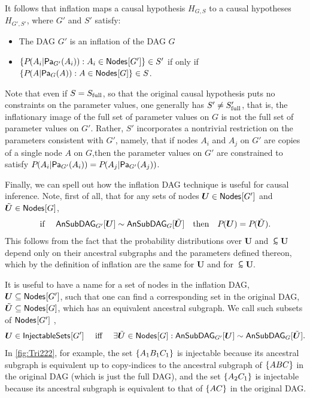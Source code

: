 It follows that inflation maps a causal hypothesis $H_{G,S}$ 
to a causal hypotheses $H_{G',S'}$,
 where $G'$ and $S'$ satisfy:
\begin{itemize}
\item The DAG $G'$ is an inflation of the DAG $G$ 
\item $\{ \pdf{A_i| \Pa[G']{A_i}} : A_i \in \SmallNamedFunction{Nodes}{G'}\} \in S'$ if only if  $\{ \pdf{A| \Pa[G]{A}} : A \in \SmallNamedFunction{Nodes}{G}\} \in S$.
\end{itemize}
Note that even if $S=S_{\rm full}$, so that the original causal hypothesis puts no constraints on the parameter values, one generally has $S'\ne S'_{\rm full}$, that is, the inflationary image of the full set of parameter values on $G$ is not the full set of parameter values on $G'$. Rather, $S'$ incorporates a nontrivial restriction on the parameters consistent with $G'$, namely, that if nodes $A_i$ and $A_j$ on $G'$ are copies of a single node $A$ on $G$,then the parameter values on $G'$ are constrained to satisfy $\pdf{A_i| \Pa[G']{A_i}}=\pdf{A_j|\Pa[G']{A_j}}$.

Finally, we can spell out how the inflation DAG technique is useful for causal inference.  Note, first of all, that for any sets of nodes $\bm{U}\in \SmallNamedFunction{Nodes}{G'}$ and   $\subsim{\bm{U}}\in \SmallNamedFunction{Nodes}{G}$,
\begin{align}\label{eq:coincidingdistrodef}
\text{if }\quad \ansubgraph[G']{\bm{U}}\sim\ansubgraph[G]{\subsim{\bm{U}}}\quad\text{then}\quad \pdf{\bm{U}}=\pdf{\subsim{\bm{U}}}.
\end{align}
This follows from the fact that the probability distributions over $\bm{U}$ and $\subsim{\bm{U}}$ depend only on their ancestral subgraphs and the parameters defined thereon, which by the definition of inflation are the same for $\bm{U}$ and for $\subsim{\bm{U}}$.

It is useful to have a name for a set of nodes in the inflation DAG, $\bm{U} \subseteq \SmallNamedFunction{Nodes}{G'}$, such that one can find a corresponding set in the original DAG, $\subsim{\bm{U}} \subseteq \SmallNamedFunction{Nodes}{G}$, which has an equivalent ancestral subgraph.   We call such subsets of $ \SmallNamedFunction{Nodes}{G'}$ ,
\begin{align}\label{eq:definjectable}
\bm{U}\in\SmallNamedFunction{InjectableSets}{G'} \quad\text{ iff }\quad \exists \subsim{\bm{U}}\in \SmallNamedFunction{Nodes}{G}: \ansubgraph[G']{\bm{U}}\sim\ansubgraph[G]{\subsim{\bm{U}}}.
\end{align}
In \cref{fig:Tri222}, for example, the set $\brackets{A_1 B_1 C_1}$ is injectable because its ancestral subgraph is equivalent up to copy-indices to the ancestral subgraph of $\brackets{A B C}$ in the original DAG (which is just the full DAG), and the set $\brackets{A_2 C_1}$ is injectable because its ancestral subgraph is equivalent to that of $\brackets{ A C}$ in the original DAG. 

